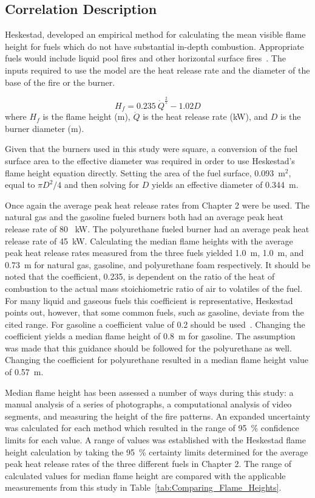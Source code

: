 \documentclass[twoside]{uocthesis}
\begin{document}
{\subsection{Correlation Description}

Heskestad, developed an empirical method for calculating the mean visible flame height for fuels which do not have substantial in-depth combustion.  Appropriate fuels would include liquid pool fires and other horizontal surface fires~\cite{Heskestad:SFPE,Beyler:1986}. The inputs required to use the model are the heat release rate and the diameter of the base of the fire or the burner.

\begin{equation}\label{eq:flame_height}
H_f = 0.235\: \dot{Q}^{\frac{2}{5}} - 1.02 D
\end{equation}
where $H_{f}$ is the flame height (m), $\dot{Q}$ is the heat release rate (kW), and $D$ is the burner diameter (m).

Given that the burners used in this study were square, a conversion of the fuel surface area to the effective diameter was required in order to use Heskestad's flame height equation directly.  Setting the area of the fuel surface, 0.093~m$^2$, equal to $\pi D^2/4$ and then solving for $D$ yields an effective diameter of 0.344~m.

Once again the average peak heat release rates from Chapter 2 were be used.  The natural gas and the gasoline fueled burners both had an average peak heat release rate of 80~ kW.  The polyurethane fueled burner had an average peak heat release rate of 45~kW.  Calculating the median flame heights with the average peak heat release rates measured from the three fuels yielded 1.0~m, 1.0~m, and 0.73~m for natural gas, gasoline, and polyurethane foam respectively. It should be noted that the coefficient, 0.235, is dependent on the ratio of the heat of combustion to the actual mass stoichiometric ratio of air to volatiles of the fuel.  For many liquid and gaseous fuels this coefficient is representative, Heskestad points out, however, that some common fuels, such as gasoline, deviate from the cited range. For gasoline a coefficient value of 0.2 should be used~\cite{Heskestad:SFPE}. Changing the coefficient yields a median flame height of 0.8~m for gasoline.  The assumption was made that this guidance should be followed for the polyurethane as well. Changing the coefficient for polyurethane resulted in a median flame height value of 0.57~m. 

Median flame height has been assessed a number of ways during this study: a manual analysis of a series of photographs, a computational analysis of video segments, and measuring the height of the fire patterns.  An expanded uncertainty was calculated for each method which resulted in the range of 95~\% confidence limits for each value.  A range of values was established with the Heskestad flame height calculation by taking the 95~\% certainty limits determined for the average peak heat release rates of the three different fuels in Chapter 2.  The range of calculated values for median flame height are compared with the applicable measurements from this study in Table~\ref{tab:Comparing_Flame_Heights}.

}
\end{document}
